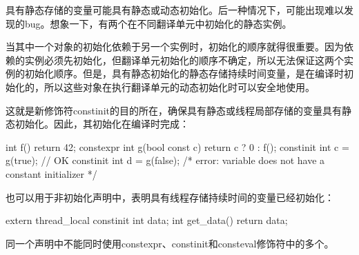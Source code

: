 具有静态存储的变量可能具有静态或动态初始化。后一种情况下，可能出现难以发现的bug。想象一下，有两个在不同翻译单元中初始化的静态实例。

当其中一个对象的初始化依赖于另一个实例时，初始化的顺序就得很重要。因为依赖的实例必须先初始化，但翻译单元初始化的顺序不确定，所以无法保证这两个实例的初始化顺序。但是，具有静态初始化的静态存储持续时间变量，是在编译时初始化的，所以这些对象在执行翻译单元的动态初始化时可以安全地使用。

这就是新修饰符constinit的目的所在，确保具有静态或线程局部存储的变量具有静态初始化。因此，其初始化在编译时完成：

\begin{cpp}
int f() { return 42; }
constexpr int g(bool const c) { return c ? 0 : f(); }
constinit int c = g(true);  // OK
constinit int d = g(false); /* error: variable does not have
                                      a constant initializer */
\end{cpp}

也可以用于非初始化声明中，表明具有线程存储持续时间的变量已经初始化：

\begin{cpp}
extern thread_local constinit int data;
int get_data() { return data; }
\end{cpp}

\begin{myNotic}
同一个声明中不能同时使用constexpr、constinit和consteval修饰符中的多个。
\end{myNotic}


